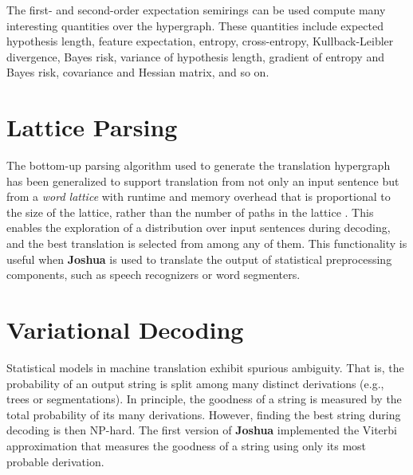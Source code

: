 \documentclass[11pt]{article}
\newcommand{\joshua}{\textbf{Joshua}\xspace}
\begin{document}

The first- and second-order expectation semirings can be used compute many interesting quantities over the hypergraph.
These quantities include expected hypothesis length, feature expectation, entropy, cross-entropy, Kullback-Leibler divergence,
Bayes risk, variance of hypothesis length, gradient of entropy and Bayes risk, covariance and Hessian matrix, and so on.


\section{Lattice Parsing}

The bottom-up parsing algorithm used to generate the translation hypergraph has been generalized to support translation from not only an input sentence but from a \emph{word lattice} with runtime and memory overhead that is proportional to the size of the lattice, rather than the number of paths in the lattice \cite{dyer-muresan-resnik:2008:ACLMain}.  This enables the exploration of a distribution over input sentences during decoding, and the best translation is selected from among any of them.  This functionality is useful when \joshua is used to translate the output of statistical preprocessing components, such as speech recognizers or word segmenters.

\section{Variational Decoding}

Statistical models in machine translation exhibit spurious ambiguity.
That is, the probability of an output string is split
among many distinct derivations (e.g., trees or
segmentations). In principle, the goodness of a
string is measured by the total probability of its
many derivations. However, finding the best string
during decoding is then NP-hard.
The first version of \joshua implemented the
Viterbi approximation that measures the goodness 
of a string using only its most probable derivation.
\end{document}
